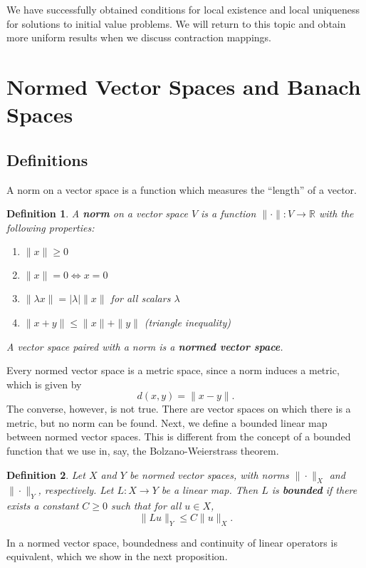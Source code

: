 \documentclass[12pt]{amsart}         %
\newtheorem{definition}{Definition}[section]
\theoremstyle{remark}
\newcommand{\R}{\mathbb{R}}
\begin{document}
We have successfully obtained conditions for local existence and local uniqueness for solutions to initial value problems. We will return to this topic and obtain more uniform results when we discuss contraction mappings.

\section{Normed Vector Spaces and Banach Spaces}

\subsection{Definitions}

A norm on a vector space is a function which measures the ``length'' of a vector.

\begin{definition}
A \textbf{norm} on a vector space $V$ is a function $\| \cdot \| : V \rightarrow \R$ with the following properties:
\begin{enumerate}
\item $\| x \| \geq 0$
\item $\|x\| = 0 \iff x = 0$
\item $\|\lambda x\| = |\lambda|  \|x\|$ for all scalars $\lambda$
\item $\|x+y\| \leq \|x\| + \|y\|$ (triangle inequality)
\end{enumerate}
A vector space paired with a norm is a \textbf{normed vector space}.
\end{definition}

Every normed vector space is a metric space, since a norm induces a metric, which is given by
\[
d(x,y) = \|x-y\|.
\]
The converse, however, is not true. There are vector spaces on which there is a metric, but no norm can be found. Next, we define a bounded linear map between normed vector spaces. This is different from the concept of a bounded function that we use in, say, the Bolzano-Weierstrass theorem.

\begin{definition}
Let $X$ and $Y$ be normed vector spaces, with norms $\|\cdot\|_X$ and $\|\cdot\|_Y$, respectively. Let $L: X \rightarrow Y$ be a linear map. Then $L$ is \textbf{bounded} if there exists a constant $C \geq 0$ such that for all $u \in X$,
\[
\|Lu\|_Y \leq C \|u\|_X.
\]
\end{definition}

In a normed vector space, boundedness and continuity of linear operators is equivalent, which we show in the next proposition.
\end{document}
